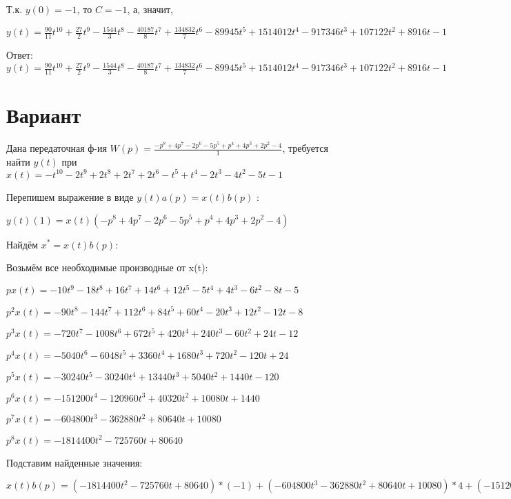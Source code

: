 \documentclass{article}
\begin{document}
Т.к. $y(0)=-1$, то $C=-1$, а, значит, 

$y(t)=\frac{90}{11}t^{10}+\frac{27}{2}t^{9}-\frac{1544}{3}t^{8}-\frac{40187}{8}t^{7}+\frac{134832}{7}t^{6}-89945t^{5}+1514012t^{4}-917346t^{3}+107122t^{2}+8916t-1$

Ответ: $y(t) = \frac{90}{11}t^{10}+\frac{27}{2}t^{9}-\frac{1544}{3}t^{8}-\frac{40187}{8}t^{7}+\frac{134832}{7}t^{6}-89945t^{5}+1514012t^{4}-917346t^{3}+107122t^{2}+8916t-1$

\section{Вариант}

Дана передаточная ф-ия $W(p)=\frac{-p^{8}+4p^{7}-2p^{6}-5p^{5}+p^{4}+4p^{3}+2p^{2}-4}{1}$, требуется найти $y(t)$ при $x(t)=-t^{10}-2t^{9}+2t^{8}+2t^{7}+2t^{6}-t^{5}+t^{4}-2t^{3}-4t^{2}-5t-1$

Перепишем выражение в виде $y(t)a(p)=x(t)b(p)$ :

$y(t)(1)=x(t)(-p^{8}+4p^{7}-2p^{6}-5p^{5}+p^{4}+4p^{3}+2p^{2}-4)$

Найдём $x^*=x(t)b(p)$:

Возьмём все необходимые производные от x(t):

$px(t)=-10t^{9}-18t^{8}+16t^{7}+14t^{6}+12t^{5}-5t^{4}+4t^{3}-6t^{2}-8t-5$

$p^2x(t)=-90t^{8}-144t^{7}+112t^{6}+84t^{5}+60t^{4}-20t^{3}+12t^{2}-12t-8$

$p^3x(t)=-720t^{7}-1008t^{6}+672t^{5}+420t^{4}+240t^{3}-60t^{2}+24t-12$

$p^4x(t)=-5040t^{6}-6048t^{5}+3360t^{4}+1680t^{3}+720t^{2}-120t+24$

$p^5x(t)=-30240t^{5}-30240t^{4}+13440t^{3}+5040t^{2}+1440t-120$

$p^6x(t)=-151200t^{4}-120960t^{3}+40320t^{2}+10080t+1440$

$p^7x(t)=-604800t^{3}-362880t^{2}+80640t+10080$

$p^8x(t)=-1814400t^{2}-725760t+80640$

Подставим найденные значения:

$x(t)b(p) = (-1814400t^{2}-725760t+80640)*(-1)+(-604800t^{3}-362880t^{2}+80640t+10080)*4+(-151200t^{4}-120960t^{3}+40320t^{2}+10080t+1440)*(-2)+(-30240t^{5}-30240t^{4}+13440t^{3}+5040t^{2}+1440t-120)*(-5)+(-5040t^{6}-6048t^{5}+3360t^{4}+1680t^{3}+720t^{2}-120t+24)*1+(-720t^{7}-1008t^{6}+672t^{5}+420t^{4}+240t^{3}-60t^{2}+24t-12)*4+(-90t^{8}-144t^{7}+112t^{6}+84t^{5}+60t^{4}-20t^{3}+12t^{2}-12t-8)*2+(-10t^{9}-18t^{8}+16t^{7}+14t^{6}+12t^{5}-5t^{4}+4t^{3}-6t^{2}-8t-5)*(-4)=40t^{9}-108t^{8}-3232t^{7}-8904t^{6}+147960t^{5}+458780t^{4}-2241896t^{3}+257568t^{2}+1020944t$
\end{document}
